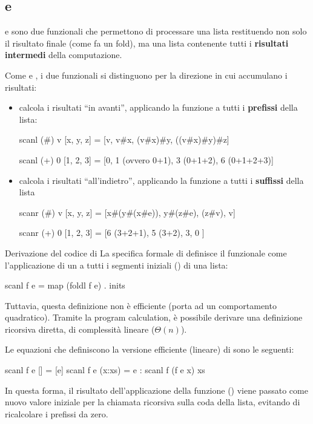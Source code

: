 \subsection{ e }
 e  sono due funzionali che permettono di processare una lista restituendo non solo il risultato finale (come fa un fold), ma una lista contenente tutti i \textbf{risultati intermedi} della computazione.

Come  e , i due funzionali si distinguono per la direzione in cui accumulano i risultati:

\begin{itemize}
    \item {} calcola i risultati ``in avanti'', applicando la funzione a tutti i \textbf{prefissi} della lista:
\begin{haskellbox}{}
scanl (#) v [x, y, z] = [v, v#x, (v#x)#y, ((v#x)#y)#z]

scanl (+) 0 [1, 2, 3] = [0, 1 (ovvero 0+1), 3 (0+1+2), 6 (0+1+2+3)]
\end{haskellbox}

\item {} calcola i risultati ``all'indietro'', applicando la funzione a tutti i \textbf{suffissi} della lista
\begin{haskellbox}{}
scanr (#) v [x, y, z] = [x#(y#(x#e)), y#(z#e), (z#v), v]

scanr (+) 0 [1, 2, 3] = [6 (3+2+1), 5 (3+2), 3, 0 ]
\end{haskellbox}

\end{itemize}

\begin{gframe}{Derivazione del codice di }
La specifica formale di  definisce il funzionale come l'applicazione di un  a tutti i segmenti iniziali () di una lista:

\begin{haskellbox}{}
scanl f e = map (foldl f e) . inits
\end{haskellbox}

Tuttavia, questa definizione non è efficiente (porta ad un comportamento quadratico).
Tramite la program calculation, è possibile derivare una definizione ricorsiva diretta, di complessità lineare ($\Theta(n)$).

Le equazioni che definiscono la versione efficiente (lineare) di  sono le seguenti:
\begin{haskellbox}{}
scanl f e [] = [e]
scanl f e (x:xs) = e : scanl f (f e x) xs
\end{haskellbox}

In questa forma, il risultato dell'applicazione della funzione () viene passato come nuovo valore iniziale per la chiamata ricorsiva sulla coda della lista, evitando di ricalcolare i prefissi da zero.
\end{gframe}

